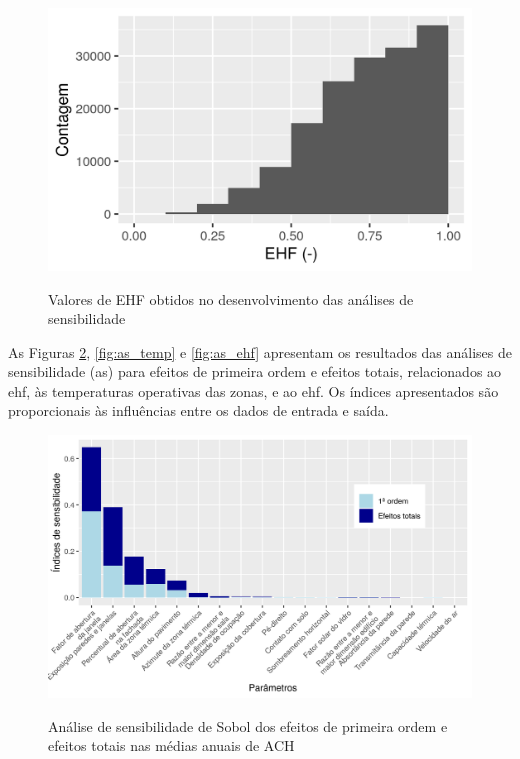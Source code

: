 \documentclass[brazil,hardcopy,openany]{ufscthesis} %
\newcommand{\sasize}{1}
\begin{document}
\begin{figure}[h]
	\centering
	\caption{Valores de EHF obtidos no desenvolvimento das análises de sensibilidade}
	\includegraphics[width=.7\linewidth]{img/sobol_EHF.png}
	\label{fig:sobol_EHF}
\end{figure}

\newpage
As Figuras \ref{fig:as_ach}, \ref{fig:as_temp} e \ref{fig:as_ehf} apresentam os resultados das análises de sensibilidade (\acrshort{as}) para efeitos de primeira ordem e efeitos totais, relacionados ao \acrshort{ehf}, às temperaturas operativas das zonas, e ao \acrshort{ehf}. Os índices apresentados são proporcionais às influências entre os dados de entrada e saída.

\begin{figure}[H]
	\centering
	\caption{Análise de sensibilidade de Sobol dos efeitos de primeira ordem e efeitos totais nas médias anuais de ACH}
	\includegraphics[width=\sasize\linewidth]{img/as_ach.png}
	\label{fig:as_ach}
\end{figure}
\end{document}
